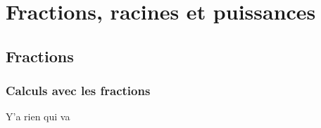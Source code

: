 \chapter{Fractions, racines et puissances}

\section{Fractions}

\subsection{Calculs avec les fractions}

Y'a rien qui va

%
